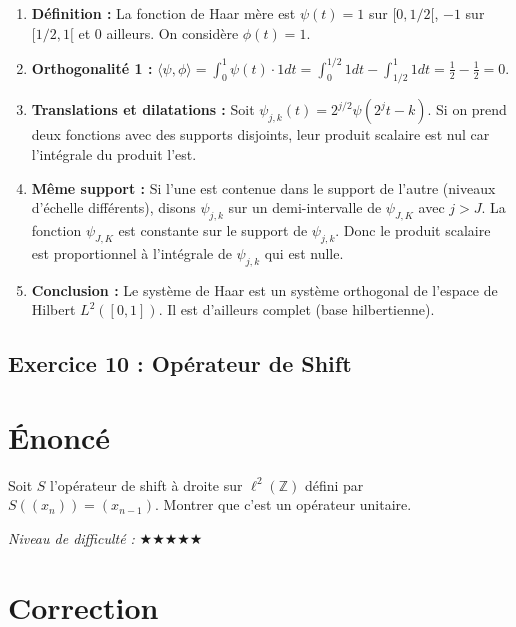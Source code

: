 \documentclass[11pt,a4paper]{article}
\begin{document}
\begin{enumerate}
\item \textbf{Définition :} La fonction de Haar mère est $\psi(t) = 1$ sur $[0, 1/2[$, $-1$ sur $[1/2, 1[$ et 0 ailleurs. On considère $\phi(t) = 1$.
\item \textbf{Orthogonalité 1 :} $\langle \psi, \phi \rangle = \int_0^1 \psi(t) \cdot 1 dt = \int_0^{1/2} 1 dt - \int_{1/2}^1 1 dt = \frac{1}{2} - \frac{1}{2} = 0$.
\item \textbf{Translations et dilatations :} Soit $\psi_{j,k}(t) = 2^{j/2} \psi(2^j t - k)$. Si on prend deux fonctions avec des supports disjoints, leur produit scalaire est nul car l'intégrale du produit l'est.
\item \textbf{Même support :} Si l'une est contenue dans le support de l'autre (niveaux d'échelle différents), disons $\psi_{j,k}$ sur un demi-intervalle de $\psi_{J,K}$ avec $j > J$. La fonction $\psi_{J,K}$ est constante sur le support de $\psi_{j,k}$. Donc le produit scalaire est proportionnel à l'intégrale de $\psi_{j,k}$ qui est nulle.
\item \textbf{Conclusion :} Le système de Haar est un système orthogonal de l'espace de Hilbert $L^2([0, 1])$. Il est d'ailleurs complet (base hilbertienne).
\end{enumerate}


\subsection*{Exercice 10 : Opérateur de Shift}

\section{Énoncé}

Soit $S$ l'opérateur de shift à droite sur $\ell^2(\mathbb{Z})$ défini par $S((x_n)) = (x_{n-1})$. Montrer que c'est un opérateur unitaire.

\textit{Niveau de difficulté :} $\bigstar\bigstar\bigstar\bigstar\bigstar$

\section{Correction}
\end{document}
